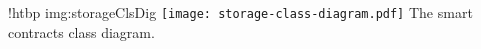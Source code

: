 \namedfigure
{!htbp}
{img:storageClsDig}
{\texttt{[image: storage-class-diagram.pdf]}}
{The smart contracts class diagram.}
